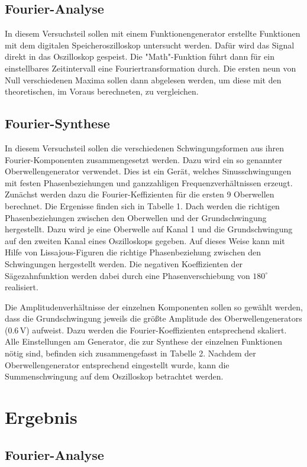\documentclass[11pt,ngerman,a4paper]{article}
\begin{document}
\subsection{Fourier-Analyse}
In diesem Versuchsteil sollen mit einem Funktionengenerator erstellte Funktionen mit dem digitalen Speicheroszilloskop untersucht werden. Dafür wird das Signal direkt in das Oszilloskop gespeist. Die "Math"-Funktion führt dann für ein einstellbares Zeitintervall eine Fouriertransformation durch. Die ersten neun von Null verschiedenen Maxima sollen dann abgelesen werden, um diese mit den theoretischen, im Voraus berechneten, zu vergleichen.
\subsection{Fourier-Synthese}

In diesem Versuchsteil sollen die verschiedenen Schwingungsformen aus ihren Fourier-Komponenten zusammengesetzt werden. Dazu wird ein so genannter Oberwellengenerator verwendet. Dies ist ein Ger\"at, welches Sinusschwingungen mit festen Phasenbeziehungen und ganzzahligen Frequenzverh\"altnissen erzeugt. Zun\"achst werden dazu die Fourier-Keffizienten f\"ur die ersten 9 Oberwellen berechnet. Die Ergenisse finden sich in Tabelle 1. Dach werden die richtigen Phasenbeziehungen zwischen den Oberwellen und der Grundschwingung hergestellt. Dazu wird je eine Oberwelle auf Kanal 1 und die Grundschwingung auf den zweiten Kanal eines Oszilloskops gegeben. Auf dieses Weise kann mit Hilfe von Lissajous-Figuren die richtige Phasenbeziehung zwischen den Schwingungen hergestellt werden. Die negativen Koeffizienten der S\"agezahnfunktion werden dabei durch eine Phasenverschiebung von $180 ^\circ$ realisiert. 

\noindent
Die Amplitudenverh\"altnisse der einzelnen Komponenten sollen so gew\"ahlt werden, dass die Grundschwingung jeweils die gr\"o\ss te Amplitude des Oberwellengenerators ($0.6\,$V) aufweist. Dazu werden die Fourier-Koeffizienten entsprechend skaliert. Alle Einstellungen am Generator, die zur Synthese der einzelnen Funktionen n\"otig sind, befinden sich zusammengefasst in Tabelle 2. Nachdem der Oberwellengenerator entsprechend eingestellt wurde, kann die Summenschwingung auf dem Oszilloskop betrachtet werden.
\section{Ergebnis}
\subsection{Fourier-Analyse}
\end{document}
